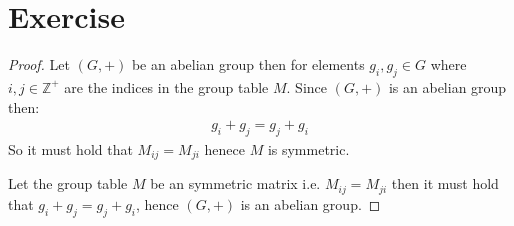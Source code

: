 \documentclass{article}
\begin{document}
\section{Exercise}
\begin{proof}
    Let $(G, +)$ be an abelian group then for elements $g_i, g_j \in G$ where $i, j
    \in \mathbb{Z}^+$ are the indices in the group table $M$. Since $(G, +)$ is an
    abelian group then:
    \begin{align*}
        g_i + g_j = g_j + g_i
    \end{align*}
    So it must hold that $M_{ij} = M_{ji}$ henece $M$ is symmetric.
    
    Let the group table $M$ be an symmetric matrix i.e. $M_{ij} = M_{ji}$ then it
    must hold that $g_i + g_j = g_j + g_i$, hence $(G, +)$ is an abelian group.
\end{proof}
\end{document}
